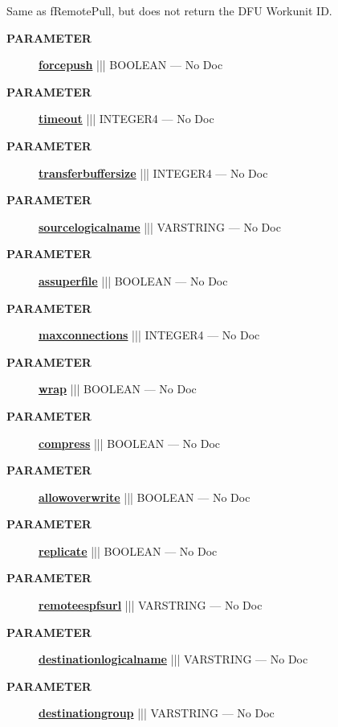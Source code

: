 \par





Same as fRemotePull, but does not return the DFU Workunit ID.






\par
\begin{description}
\item [\colorbox{tagtype}{\color{white} \textbf{\textsf{PARAMETER}}}] \textbf{\underline{forcepush}} ||| BOOLEAN --- No Doc
\item [\colorbox{tagtype}{\color{white} \textbf{\textsf{PARAMETER}}}] \textbf{\underline{timeout}} ||| INTEGER4 --- No Doc
\item [\colorbox{tagtype}{\color{white} \textbf{\textsf{PARAMETER}}}] \textbf{\underline{transferbuffersize}} ||| INTEGER4 --- No Doc
\item [\colorbox{tagtype}{\color{white} \textbf{\textsf{PARAMETER}}}] \textbf{\underline{sourcelogicalname}} ||| VARSTRING --- No Doc
\item [\colorbox{tagtype}{\color{white} \textbf{\textsf{PARAMETER}}}] \textbf{\underline{assuperfile}} ||| BOOLEAN --- No Doc
\item [\colorbox{tagtype}{\color{white} \textbf{\textsf{PARAMETER}}}] \textbf{\underline{maxconnections}} ||| INTEGER4 --- No Doc
\item [\colorbox{tagtype}{\color{white} \textbf{\textsf{PARAMETER}}}] \textbf{\underline{wrap}} ||| BOOLEAN --- No Doc
\item [\colorbox{tagtype}{\color{white} \textbf{\textsf{PARAMETER}}}] \textbf{\underline{compress}} ||| BOOLEAN --- No Doc
\item [\colorbox{tagtype}{\color{white} \textbf{\textsf{PARAMETER}}}] \textbf{\underline{allowoverwrite}} ||| BOOLEAN --- No Doc
\item [\colorbox{tagtype}{\color{white} \textbf{\textsf{PARAMETER}}}] \textbf{\underline{replicate}} ||| BOOLEAN --- No Doc
\item [\colorbox{tagtype}{\color{white} \textbf{\textsf{PARAMETER}}}] \textbf{\underline{remoteespfsurl}} ||| VARSTRING --- No Doc
\item [\colorbox{tagtype}{\color{white} \textbf{\textsf{PARAMETER}}}] \textbf{\underline{destinationlogicalname}} ||| VARSTRING --- No Doc
\item [\colorbox{tagtype}{\color{white} \textbf{\textsf{PARAMETER}}}] \textbf{\underline{destinationgroup}} ||| VARSTRING --- No Doc
\end{description}







